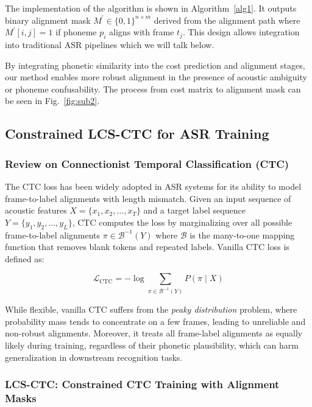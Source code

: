 The implementation of the algorithm is shown in Algorithm~\ref{alg1}. It outputs binary alignment mask $M^{'} \in \{0,1\}^{n \times m}$ derived from the alignment path where $M^{'}[i,j] = 1$ if phoneme $p_i$ aligns with frame $t_j$. This design allows integration into traditional ASR pipelines which we will talk below.

By integrating phonetic similarity into the cost prediction and alignment stages, our method enables more robust alignment in the presence of acoustic ambiguity or phoneme confusability. The process from cost matrix to alignment mask can be seen in Fig.~\ref{fig:sub2}.

\subsection{Constrained LCS-CTC for ASR Training}


\subsubsection{Review on Connectionist Temporal Classification (CTC)}

The CTC loss has been widely adopted in ASR systems for its ability to model frame-to-label alignments with length mismatch. Given an input sequence of acoustic features $X = \{x_1, x_2, \dots, x_T\}$ and a target label sequence $Y = \{y_1, y_2, \dots, y_L\}$, CTC computes the loss by marginalizing over all possible frame-to-label alignments $\pi \in \mathcal{B}^{-1}(Y)$ where $\mathcal{B}$ is the many-to-one mapping function that removes blank tokens and repeated labels. Vanilla CTC loss is defined as:

\begin{equation*}
\mathcal{L}_{\text{CTC}} = -\log \sum_{\pi \in \mathcal{B}^{-1}(Y)} P(\pi \mid X)
\end{equation*}

 While flexible, vanilla CTC suffers from the \emph{peaky distribution} problem, where probability mass tends to concentrate on a few frames, leading to unreliable and non-robust alignments. Moreover, it treats all frame-label alignments as equally likely during training, regardless of their phonetic plausibility, which can harm generalization in downstream recognition tasks.

\subsubsection{LCS-CTC: Constrained CTC Training with Alignment Masks}


